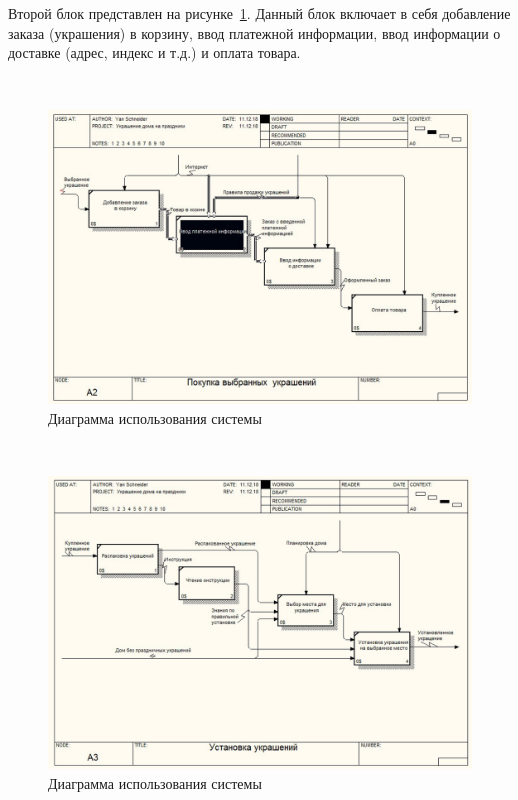 Второй блок представлен на рисунке~\ref{fig:develop:functionalModel:a2_buy}. Данный блок включает в себя добавление заказа (украшения) в корзину, ввод платежной информации, ввод информации о доставке (адрес, индекс и т.д.) и оплата товара.

 ~
\begin{figure}[H]
\centering
	\includegraphics[scale=0.6]{figures/functionalModel/a2_buy.jpg}
	\caption{Диаграмма использования системы}
	\label{fig:develop:functionalModel:a2_buy}
\end{figure}

 ~
\begin{figure}[H]
\centering
	\includegraphics[scale=0.6]{figures/functionalModel/a3_install.jpg}
	\caption{Диаграмма использования системы}
	\label{fig:develop:functionalModel:a3_install}
\end{figure}


